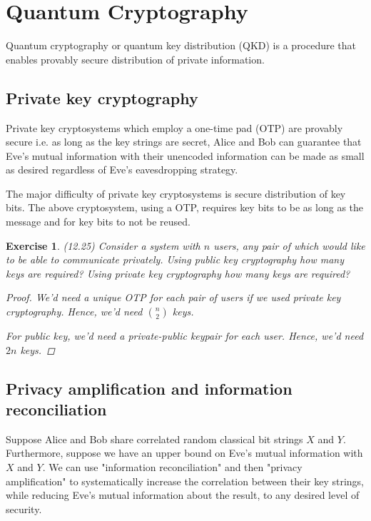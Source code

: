 \documentclass[11pt]{article}
\newcommand\0{\mathbf{0}}
\newcommand\<{\langle}
\renewcommand\>{\rangle}
\newtheorem{exercise}[theorem]{Exercise}
\begin{document}
\section{Quantum Cryptography}

Quantum cryptography or quantum key distribution (QKD) is a procedure that enables provably secure distribution of private information. 

\subsection{Private key cryptography}

Private key cryptosystems which employ a one-time pad (OTP) are provably secure i.e. as long as the key strings are secret, Alice and Bob can guarantee that Eve's mutual information with their unencoded information can be made as small as desired regardless of Eve's eavesdropping strategy.

The major difficulty of private key cryptosystems is secure distribution of key bits. The above cryptosystem, using a OTP, requires key bits to be as long as the message and for key bits to not be reused. 

\begin{exercise}(12.25)
Consider a system with $n$ users, any pair of which would like to be able to communicate privately. Using public key cryptography how many keys are required? Using private key cryptography how many keys are required? 
\begin{proof}
	We'd need a unique OTP for each pair of users if we used private key cryptography. Hence, we'd need $\binom{n}{2}$ keys. 
	
	For public key, we'd need a private-public keypair for each user. Hence, we'd need $2n$ keys. 
\end{proof}
\end{exercise}

\subsection{Privacy amplification and information reconciliation}

Suppose Alice and Bob share correlated random classical bit strings $X$ and $Y$. Furthermore, suppose we have an upper bound on Eve's mutual information with $X$ and $Y$. We can use "information reconciliation" and then "privacy amplification" to systematically increase the correlation between their key strings, while reducing Eve's mutual information about the result, to any desired level of security.
\end{document}
